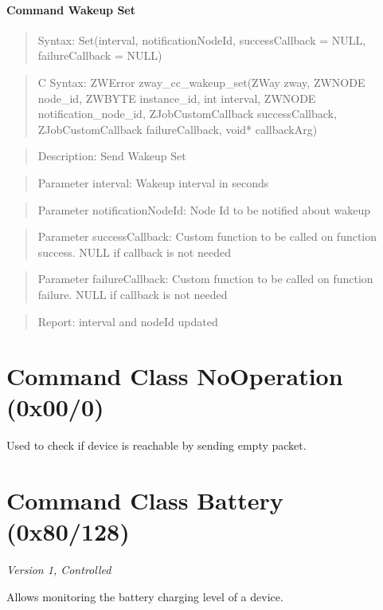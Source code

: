 \paragraph{Command Wakeup Set}
\begin{quote}Syntax: Set(interval, notificationNodeId, successCallback = NULL, failureCallback = NULL)\end{quote}
\begin{quote}C Syntax: ZWError zway\_cc\_wakeup\_set(ZWay zway, ZWNODE node\_id, ZWBYTE instance\_id, int interval, ZWNODE notification\_node\_id, ZJobCustomCallback successCallback, ZJobCustomCallback failureCallback, void* callbackArg)\end{quote}
\begin{quote}Description: Send Wakeup Set\end{quote}
\begin{quote}Parameter interval: Wakeup interval in seconds\end{quote}
\begin{quote}Parameter notificationNodeId: Node Id to be notified about wakeup\end{quote}
\begin{quote}Parameter successCallback: Custom function to be called on function success. NULL if callback is not needed\end{quote}
\begin{quote}Parameter failureCallback: Custom function to be called on function failure. NULL if callback is not needed\end{quote}
\begin{quote}Report: interval and nodeId updated\end{quote}


\section{Command Class NoOperation (0x00/0)}

Used to check if device is reachable by sending empty packet.

\section{Command Class Battery (0x80/128)}

\textit{Version 1, Controlled}
\newline

Allows monitoring the battery charging level of a device.
\newline

